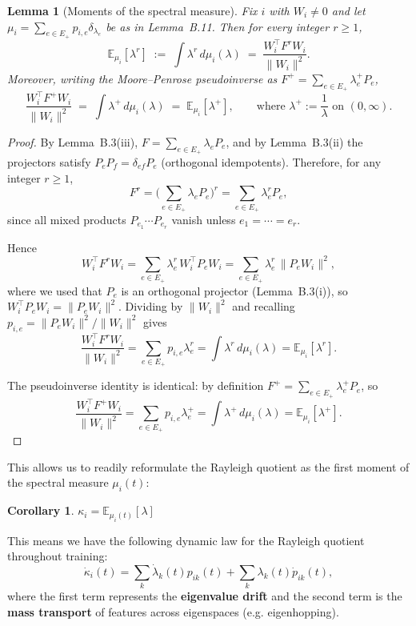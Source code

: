 \documentclass{article}
\theoremstyle{plain}
\newtheorem{corollary}[theorem]{Corollary}
\newtheorem{lemma}{Lemma}[section]
\numberwithin{equation}{section}
\theoremstyle{definition}
\theoremstyle{remark}
\begin{document}
\begin{lemmaproofbox}
\label{lemma:moments}
\begin{lemma}[Moments of the spectral measure]
Fix $i$ with $W_i\neq 0$ and let $\mu_i=\sum_{e\in E_+}p_{i,e}\delta_{\lambda_e}$ be as in Lemma~B.11.
Then for every integer $r\ge 1$,
\[
\mathbb{E}_{\mu_i}[\lambda^r]
\;:=\; \int \lambda^r\, d\mu_i(\lambda)
\;=\; \frac{W_i^\top F^r W_i}{\|W_i\|^2}.
\]
Moreover, writing the Moore--Penrose pseudoinverse as $F^{+}=\sum_{e\in E_+}\lambda_e^{+}P_e$,
\[
\frac{W_i^\top F^{+} W_i}{\|W_i\|^2}
\;=\; \int \lambda^{+}\, d\mu_i(\lambda)
\;=\; \mathbb{E}_{\mu_i}[\lambda^{+}],
\qquad\text{where }\lambda^{+}:=\frac{1}{\lambda}\text{ on }(0,\infty).
\]
\end{lemma}
\begin{proof}
By Lemma~B.3(iii), $F=\sum_{e\in E_+}\lambda_e P_e$, and by Lemma~B.3(ii) the projectors satisfy
$P_eP_f=\delta_{ef}P_e$ (orthogonal idempotents).
Therefore, for any integer $r\ge 1$,
\[
F^r
=\Big(\sum_{e\in E_+}\lambda_e P_e\Big)^r
=\sum_{e\in E_+}\lambda_e^r P_e,
\]
since all mixed products $P_{e_1}\cdots P_{e_r}$ vanish unless $e_1=\cdots=e_r$.

Hence
\[
W_i^\top F^r W_i
= \sum_{e\in E_+}\lambda_e^r\, W_i^\top P_e W_i
= \sum_{e\in E_+}\lambda_e^r\, \|P_eW_i\|^2,
\]
where we used that $P_e$ is an orthogonal projector (Lemma~B.3(i)), so $W_i^\top P_e W_i=\|P_eW_i\|^2$.
Dividing by $\|W_i\|^2$ and recalling $p_{i,e}=\|P_eW_i\|^2/\|W_i\|^2$ gives
\[
\frac{W_i^\top F^r W_i}{\|W_i\|^2}
= \sum_{e\in E_+} p_{i,e}\lambda_e^r
= \int \lambda^r\, d\mu_i(\lambda)
= \mathbb{E}_{\mu_i}[\lambda^r].
\]

The pseudoinverse identity is identical: by definition $F^{+}=\sum_{e\in E_+}\lambda_e^{+}P_e$,
so
\[
\frac{W_i^\top F^{+} W_i}{\|W_i\|^2}
= \sum_{e\in E_+} p_{i,e}\lambda_e^{+}
= \int \lambda^{+}\, d\mu_i(\lambda)
= \mathbb{E}_{\mu_i}[\lambda^{+}].
\]
\end{proof}
\end{lemmaproofbox}

This allows us to readily reformulate the Rayleigh quotient as the first moment of the spectral measure $\mu_i(t)$: 
\begin{corollary}
$\kappa_i = \mathbb{E}_{\mu_i(t)}[\lambda]$
\end{corollary}

This means we have the following dynamic law for the Rayleigh quotient throughout training: $$\dot \kappa_i(t) = \sum_k \dot \lambda_k (t) p_{ik}(t) + \sum_k \lambda_k(t)\dot p_{ik}(t),$$
where the first term represents the \textbf{eigenvalue drift} and the second term is the \textbf{mass transport} of features across eigenspaces (e.g. eigenhopping). 
\end{document}
